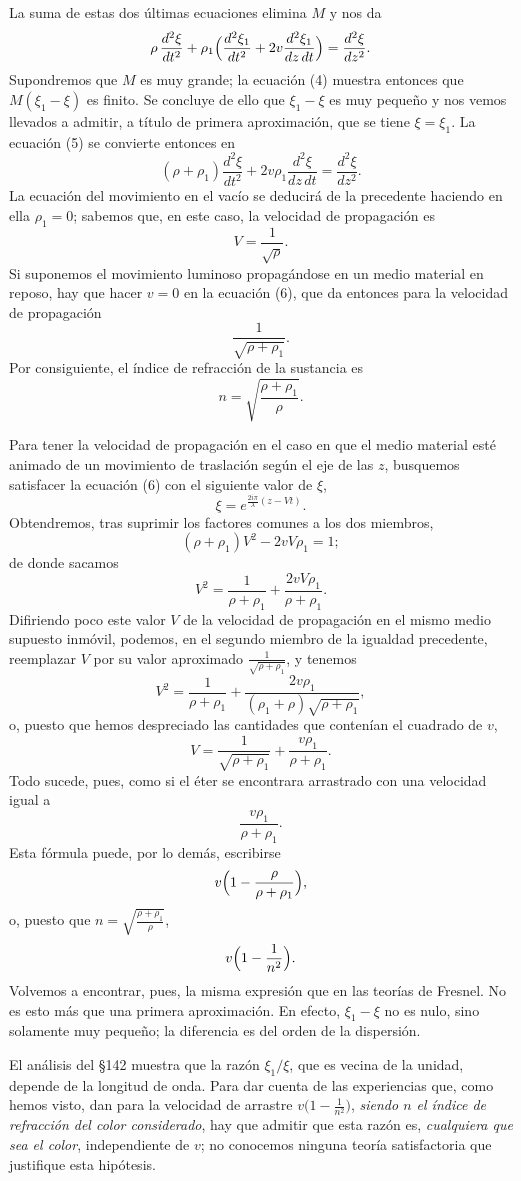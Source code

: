 La suma de estas dos últimas ecuaciones elimina $M$ y nos da
\begin{equation}
\rho\,\frac{d^2\xi}{dt^2} + \rho_1\Bigl(\frac{d^2\xi_1}{dt^2} +
2v\frac{d^2\xi_1}{dz\,dt}\Bigr) = \frac{d^2\xi}{dz^2}.
\end{equation}
Supondremos que $M$ es muy grande; la ecuación (4) muestra entonces que
$M(\xi_1-\xi)$ es finito. Se concluye de ello que $\xi_1-\xi$ es muy pequeño
y nos vemos llevados a admitir, a título de primera aproximación, que se
tiene $\xi=\xi_1$. La ecuación (5) se convierte entonces en
\begin{equation}
(\rho+\rho_1)\frac{d^2\xi}{dt^2} + 2v\rho_1\frac{d^2\xi}{dz\,dt} =
\frac{d^2\xi}{dz^2}.
\end{equation}
La ecuación del movimiento en el vacío se deducirá de la precedente
haciendo en ella $\rho_1=0$; sabemos que, en este caso, la velocidad de
propagación es
\[
V = \frac{1}{\sqrt{\rho}}.
\]
Si suponemos el movimiento luminoso propagándose en un medio material en
reposo, hay que hacer $v=0$ en la ecuación (6), que da entonces para la
velocidad de propagación
\[
\frac{1}{\sqrt{\rho+\rho_1}}.
\]
Por consiguiente, el índice de refracción de la sustancia es
\[
n = \sqrt{\frac{\rho+\rho_1}{\rho}}.
\]

Para tener la velocidad de propagación en el caso en que el medio material
esté animado de un movimiento de traslación según el eje de las $z$,
busquemos satisfacer la ecuación (6) con el siguiente valor de $\xi$,
\[
\xi = e^{\frac{2i\pi}{\lambda}(z-Vt)}.
\]
Obtendremos, tras suprimir los factores comunes a los dos miembros,
\[
(\rho+\rho_1)V^2 - 2vV\rho_1 = 1;
\]
de donde sacamos
\[
V^2 = \frac{1}{\rho+\rho_1} + \frac{2vV\rho_1}{\rho+\rho_1}.
\]
Difiriendo poco este valor $V$ de la velocidad de propagación en el mismo
medio supuesto inmóvil, podemos, en el segundo miembro de la igualdad
precedente, reemplazar $V$ por su valor aproximado
$\tfrac{1}{\sqrt{\rho+\rho_1}}$, y tenemos
\[
V^2 = \frac{1}{\rho+\rho_1} + \frac{2v\rho_1}{(\rho_1+\rho)\sqrt{\rho+\rho_1}},
\]
o, puesto que hemos despreciado las cantidades que contenían el cuadrado de
$v$,
\[
V = \frac{1}{\sqrt{\rho+\rho_1}} + \frac{v\rho_1}{\rho+\rho_1}.
\]
Todo sucede, pues, como si el éter se encontrara arrastrado con una
velocidad igual a
\[
\frac{v\rho_1}{\rho+\rho_1}.
\]
Esta fórmula puede, por lo demás, escribirse
\[
v\Bigl(1-\frac{\rho}{\rho+\rho_1}\Bigr),
\]
o, puesto que $n=\sqrt{\tfrac{\rho+\rho_1}{\rho}}$,
\[
v\Bigl(1-\frac{1}{n^2}\Bigr).
\]
Volvemos a encontrar, pues, la misma expresión que en las teorías de
Fresnel. No es esto más que una primera aproximación. En efecto, $\xi_1-\xi$
no es nulo, sino solamente muy pequeño; la diferencia es del orden de la
dispersión.

El análisis del §142 muestra que la razón
$\xi_1/\xi$, que es vecina de la unidad, depende de la longitud de onda.
Para dar cuenta de las experiencias que, como hemos visto, dan para la
velocidad de arrastre $v\bigl(1-\tfrac{1}{n^2}\bigr)$, \emph{siendo $n$ el
índice de refracción del color considerado}, hay que admitir que esta razón
es, \emph{cualquiera que sea el color}, independiente de $v$; no conocemos ninguna
teoría satisfactoria que justifique esta hipótesis.
